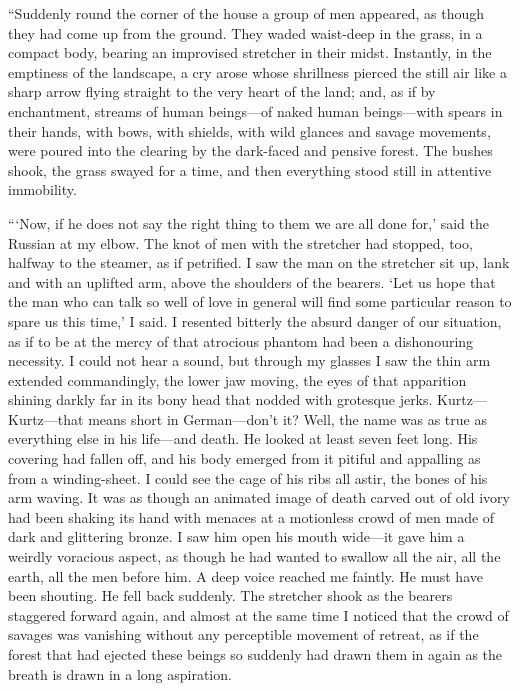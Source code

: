 \documentclass[12pt]{report}
\begin{document}
``Suddenly round the corner of the house a group of men appeared, as
though they had come up from the ground. They waded waist-deep in the
grass, in a compact body, bearing an improvised stretcher in their
midst. Instantly, in the emptiness of the landscape, a cry arose whose
shrillness pierced the still air like a sharp arrow flying straight to
the very heart of the land; and, as if by enchantment, streams of human
beings---of naked human beings---with spears in their hands, with bows,
with shields, with wild glances and savage movements, were poured into
the clearing by the dark-faced and pensive forest. The bushes shook, the
grass swayed for a time, and then everything stood still in attentive
immobility.

```Now, if he does not say the right thing to them we are all done for,'
said the Russian at my elbow. The knot of men with the stretcher had
stopped, too, halfway to the steamer, as if petrified. I saw the man on
the stretcher sit up, lank and with an uplifted arm, above the shoulders
of the bearers. `Let us hope that the man who can talk so well of love
in general will find some particular reason to spare us this time,' I
said. I resented bitterly the absurd danger of our situation, as if to
be at the mercy of that atrocious phantom had been a dishonouring
necessity. I could not hear a sound, but through my glasses I saw the
thin arm extended commandingly, the lower jaw moving, the eyes of that
apparition shining darkly far in its bony head that nodded with
grotesque jerks. Kurtz---Kurtz---that means short in German---don't it?
Well, the name was as true as everything else in his life---and death.
He looked at least seven feet long. His covering had fallen off, and his
body emerged from it pitiful and appalling as from a winding-sheet. I
could see the cage of his ribs all astir, the bones of his arm waving.
It was as though an animated image of death carved out of old ivory had
been shaking its hand with menaces at a motionless crowd of men made of
dark and glittering bronze. I saw him open his mouth wide---it gave him
a weirdly voracious aspect, as though he had wanted to swallow all the
air, all the earth, all the men before him. A deep voice reached me
faintly. He must have been shouting. He fell back suddenly. The
stretcher shook as the bearers staggered forward again, and almost at
the same time I noticed that the crowd of savages was vanishing without
any perceptible movement of retreat, as if the forest that had ejected
these beings so suddenly had drawn them in again as the breath is drawn
in a long aspiration.
\end{document}
